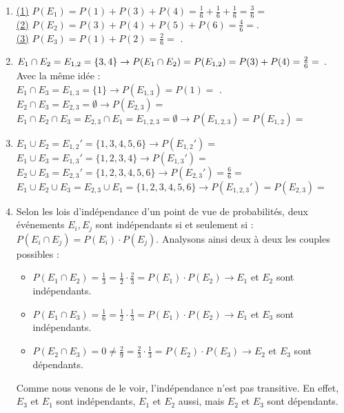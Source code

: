 \documentclass[12pt,a4paper]{article}
\begin{document}
\begin{enumerate}
	\item \underline{(1)} $P(E_1) = P(1) + P(3) + P(4) = \frac{1}{6} + \frac{1}{6} + \frac{1}{6} = \frac{3}{6} = $\\
		\underline{(2)} $P(E_2) = P(3) + P(4) + P(5) + P(6) = \frac{4}{6} = $.\\
		\underline{(3)} $P(E_3) = P(1) + P(2) = \frac{2}{6} =$ .
	\item $E_1\cap E_2 = E_{1,2} = \{3,4\} \\
	\to P(E_1 \cap E_2) = P(E_{1,2}) = P(3) + P(4) = \frac{2}{6} =$ .\\
	Avec la même idée : \\
	$E_1\cap E_3 = E_{1,3}  = \{1\}\to P(E_{1,3}) = P(1) =$ .\\
	$E_2 \cap E_3 = E_{2,3} = \emptyset \to P(E_{2,3}) =$ \\
	$E_1 \cap E_2 \cap E_3 = E_{2,3} \cap E_1 = E_{1,2,3} = \emptyset \to P(E_{1,2,3}) = P(E_{1,2}) =$ 
	\item $E_1 \cup E_2 = E_{1,2}' = \{1,3,4,5,6\} \to P(E_{1,2}') = $ \\
	$E_1 \cup E_3 = E_{1,3}' = \{1,2,3,4\} \to P(E_{1,3}') = $ \\
	$E_2 \cup E_3 = E_{2,3}' = \{1,2,3,4,5,6\} \to P(E_{2,3}') = \frac{6}{6} =$ \\
	$E_1 \cup E_2 \cup E_3 = E_{2,3} \cup E_1 = \{1,2,3,4,5,6\} \to P(E_{1,2,3}') = P(E_{2,3}) =$ 
	\item Selon les lois d'indépendance d'un point de vue de probabilités, deux événements $E_i,E_j$ sont indépendants si et seulement si : $P(E_i \cap E_j) = P(E_i)\cdot P(E_j)$. Analysons ainsi deux à deux les couples possibles :
	\begin{itemize}
		\item $P(E_1\cap E_2) = \frac{1}{3} = \frac{1}{2}\cdot\frac{2}{3} = P(E_1)\cdot P(E_2) \to E_1$ et $E_2$ sont indépendants.
		\item $P(E_1 \cap E_3) = \frac{1}{6} = \frac{1}{2} \cdot \frac{1}{3} = P(E_1)\cdot P(E_2) \to E_1$ et $E_3$ sont indépendants.
		\item $P(E_2 \cap E_3) = 0 \neq\frac{2}{9} = \frac{2}{3} \cdot \frac{1}{3} = P(E_2)\cdot P(E_3) \to E_2$ et $E_3$ sont dépendants.
	\end{itemize}
		Comme nous venons de le voir, l'indépendance n'est pas transitive. En effet, $E_3$ et $E_1$ sont indépendants, $E_1$ et $E_2$ aussi, mais $E_2$ et $E_3$ sont dépendants.
\end{enumerate}
\end{document}
